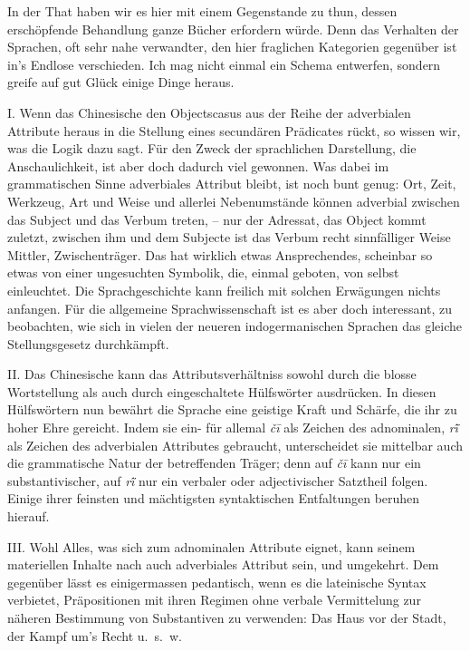 In der That haben wir es hier mit einem Gegenstande zu thun, dessen erschöpfende Behandlung ganze Bücher erfordern würde. Denn das Verhalten der Sprachen, oft sehr nahe verwandter, den hier fraglichen Kategorien gegenüber ist in’s Endlose verschieden. Ich mag nicht einmal ein Schema entwerfen, sondern greife auf gut Glück einige Dinge heraus.

I. Wenn das Chinesische den Objectscasus aus der Reihe der adverbialen Attribute heraus in die Stellung eines secundären Prädicates rückt, so wissen wir, was die Logik dazu sagt. Für den Zweck der sprachlichen Darstellung, die Anschaulichkeit, ist aber doch dadurch viel gewonnen. Was dabei im grammatischen Sinne adverbiales Attribut bleibt, ist noch bunt genug: Ort, Zeit, Werkzeug, Art und Weise und allerlei Nebenumstände können adverbial zwischen das Subject und das Verbum treten, – nur der Adressat, das Object kommt zuletzt, zwischen ihm und dem Subjecte ist das Verbum recht sinnfälliger Weise Mittler, Zwischenträger. Das hat wirklich etwas Ansprechendes, scheinbar  so etwas von einer ungesuchten Symbolik, die, einmal geboten, von selbst einleuchtet. Die Sprachgeschichte kann freilich mit solchen Erwägungen nichts an\label{sp.462}fangen. Für die allgemeine Sprachwissenschaft ist es aber doch interessant, zu beobachten, wie sich in vielen der neueren indogermanischen Sprachen das gleiche Stellungsgesetz durchkämpft.

II. Das Chinesische kann das Attributsverhältniss sowohl durch die blosse Wortstellung als auch durch eingeschaltete Hülfswörter ausdrücken. In diesen Hülfswörtern nun bewährt die Sprache eine geistige Kraft und Schärfe, die ihr zu hoher Ehre gereicht. Indem sie ein- für allemal \textit{čī} als Zeichen des adnominalen, \textit{r\^{ï}} als Zeichen des adverbialen Attributes gebraucht, unterscheidet sie mittelbar auch die grammatische \label{fp.442} Natur der betreffenden Träger; denn auf \textit{čī} kann nur ein substantivischer, auf \textit{r\^{ï}} nur ein verbaler oder adjectivischer Satztheil folgen. Einige ihrer feinsten und mächtigsten syntaktischen Entfaltungen beruhen hierauf.

III. Wohl Alles, was sich zum adnominalen Attribute eignet, kann seinem materiellen Inhalte nach auch adverbiales Attribut sein, und umgekehrt. Dem gegenüber lässt es einigermassen pedantisch, wenn es die lateinische Syntax verbietet, Präpositionen mit ihren Regimen ohne verbale Vermittelung zur näheren Bestimmung von Substantiven zu verwenden: Das Haus vor der Stadt, der Kampf um’s Recht u.~s.~w.

